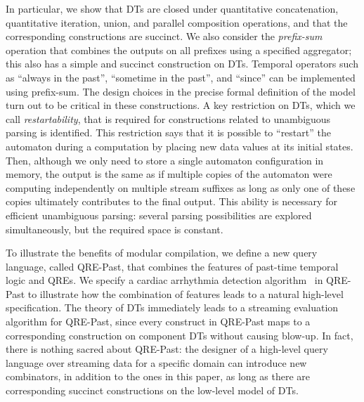 In particular, we show that DTs are closed under
quantitative concatenation, quantitative iteration, union, and parallel composition operations,
and that the corresponding constructions are succinct.
We also consider the \emph{prefix-sum} operation that combines the outputs on all prefixes using
a specified aggregator; this also has a simple and succinct construction on DTs.
Temporal operators such as ``always in the past'', ``sometime in the past'', and ``since'' can be
implemented using prefix-sum.
The design choices in the precise formal definition of the model turn out to be critical in these constructions.
A key restriction on DTs, which we call \emph{restartability}, that is required
for constructions related to unambiguous parsing is identified.
This restriction says that it is possible to ``restart'' the automaton during
a computation by placing new data values at its initial states.
Then, although we only need to store a single automaton configuration in memory, the output is the same as if multiple copies of the automaton were computing
independently on multiple stream suffixes as long as only one of these copies ultimately contributes to the final output.
This ability is necessary for efficient unambiguous parsing: several parsing possibilities
are explored simultaneously, but the required space is constant.

To illustrate the benefits of modular compilation, we define a new query language, called QRE-Past,
that combines the features of past-time temporal logic and QREs.
We specify a cardiac arrhythmia detection algorithm~\cite{AAMMR2018,ZI2016ICD} in QRE-Past to illustrate how
the combination of features leads to a natural high-level specification.
The theory of DTs immediately leads to a streaming evaluation algorithm for QRE-Past,
since every construct in QRE-Past maps to a corresponding construction on component DTs without
causing blow-up.
In fact, there is nothing sacred about QRE-Past: the designer of a high-level
query language over streaming data for a specific domain can introduce new combinators,
in addition to the ones in this paper, as long as there are corresponding succinct constructions
on the low-level model of DTs.

